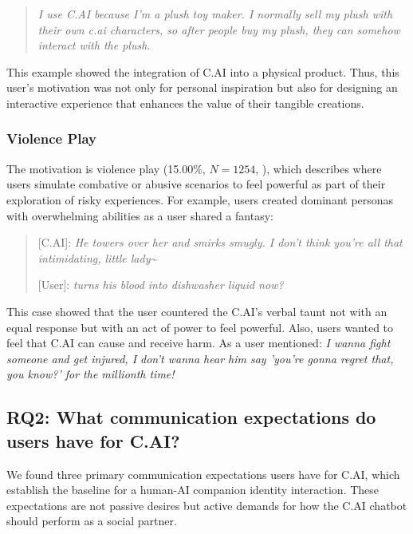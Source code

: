 \documentclass[sigconf, nonacm]{acmart}
\newcommand{\implications}[1]{{\color{black}{#1}}}
\begin{document}
\begin{quote}
    \textit{I use C.AI because I'm a plush toy maker. I normally sell my plush with their own c.ai characters, so after people buy my plush, they can somehow interact with the plush.}
\end{quote}

This example showed the integration of C.AI into a physical product. Thus, this user's motivation was not only for personal inspiration but also for designing an interactive experience that enhances the value of their tangible creations.


\subsubsection{Violence Play}
\label{ViolencePlay}
The \implications{last} motivation is violence play (15.00\%, $N=1254$, \implications{or 5.60\% of all posts}), which describes where users simulate combative or abusive scenarios to feel powerful as part of their exploration of risky experiences. For example, users created dominant personas with overwhelming abilities as a user shared a fantasy:

\begin{quote}
    [C.AI]: \textit{He towers over her and smirks smugly. I don't think you're all that intimidating, little lady\textasciitilde}

    [User]: \textit{turns his blood into dishwasher liquid now?}
\end{quote}

This case showed that the user countered the C.AI's verbal taunt not with an equal response but with an act of power to feel powerful. Also, users wanted to feel that C.AI can cause and receive harm. As a user mentioned: \textit{I wanna fight someone and get injured, I don't wanna hear him say 'you're gonna regret that, you know?' for the millionth time!}

\subsection{RQ2: What communication expectations do users have for C.AI?}
We found three primary communication expectations users have for C.AI, which establish the baseline for a human-AI companion identity interaction. These expectations are not passive desires but active demands for how the C.AI chatbot should perform as a social partner.
\end{document}
